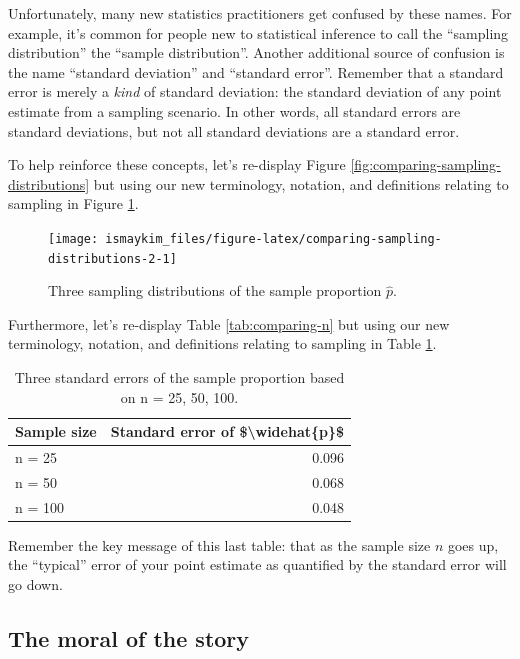 \documentclass[12pt, krantz2,]{krantz}
\begin{document}
Unfortunately, many new statistics practitioners get confused by these names. For example, it's common for people new to statistical inference to call the ``sampling distribution'' the ``sample distribution''. Another additional source of confusion is the name ``standard deviation'' and ``standard error''. Remember that a standard error is merely a \emph{kind} of standard deviation: the standard deviation of any point estimate from a sampling scenario. In other words, all standard errors are standard deviations, but not all standard deviations are a standard error.

To help reinforce these concepts, let's re-display Figure \ref{fig:comparing-sampling-distributions} but using our new terminology, notation, and definitions relating to sampling in Figure \ref{fig:comparing-sampling-distributions-2}.

\begin{figure}

{\centering \texttt{[image: ismaykim\_files/figure-latex/comparing-sampling-distributions-2-1]} 

}

\caption{Three sampling distributions of the sample proportion $\widehat{p}$.}\label{fig:comparing-sampling-distributions-2}
\end{figure}

Furthermore, let's re-display Table \ref{tab:comparing-n} but using our new terminology, notation, and definitions relating to sampling in Table \ref{tab:comparing-n-2}.

\begin{table}[H]

\caption{\label{tab:comparing-n-2}Three standard errors of the sample proportion based on n = 25, 50, 100. }
\centering
\fontsize{10}{12}\selectfont
\begin{tabular}{lr}
\toprule
Sample size & Standard error of \$\textbackslash{}widehat\{p\}\$\\
\midrule
n = 25 & 0.096\\
n = 50 & 0.068\\
n = 100 & 0.048\\
\bottomrule
\end{tabular}
\end{table}

Remember the key message of this last table: that as the sample size \(n\) goes up, the ``typical'' error of your point estimate as quantified by the standard error will go down.

\hypertarget{the-moral-of-the-story}{%
\subsection{The moral of the story}\label{the-moral-of-the-story}}
\end{document}
